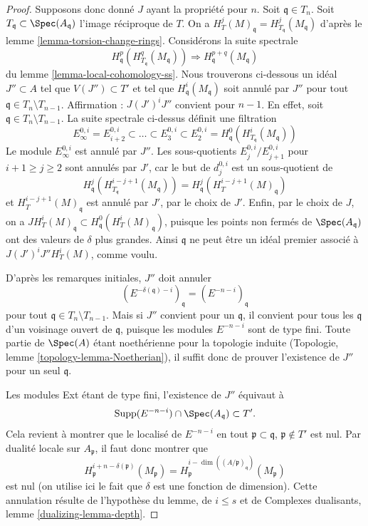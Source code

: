 \begin{proof}
\medskip\noindent
Supposons donc donné $J$ ayant la propriété pour $n$. Soit $\mathfrak q \in T_n$. Soit $T_\mathfrak q \subset \Spec(A_\mathfrak q)$ l'image réciproque de $T$. On a $H^j_T(M)_\mathfrak q = H^j_{T_\mathfrak q}(M_\mathfrak q)$ d'après le lemme \ref{lemma-torsion-change-rings}. Considérons la suite spectrale
$$
H_\mathfrak q^p(H^q_{T_\mathfrak q}(M_\mathfrak q))
\Rightarrow
H^{p + q}_\mathfrak q(M_\mathfrak q)
$$
du lemme \ref{lemma-local-cohomology-ss}. Nous trouverons ci-dessous un idéal $J'' \subset A$ tel que $V(J'') \subset T'$ et tel que $H^i_\mathfrak q(M_\mathfrak q)$ soit annulé par $J''$ pour tout $\mathfrak q \in T_n \setminus T_{n - 1}$. Affirmation : $J (J')^i J''$ convient pour $n - 1$. En effet, soit $\mathfrak q \in T_n \setminus T_{n - 1}$. La suite spectrale ci-dessus définit une filtration
$$
E_\infty^{0, i} = E_{i + 2}^{0, i} \subset \ldots \subset E_3^{0, i} \subset
E_2^{0, i} = H^0_\mathfrak q(H^i_{T_\mathfrak q}(M_\mathfrak q))
$$
Le module $E_\infty^{0, i}$ est annulé par $J''$. Les sous-quotients $E_j^{0, i}/E_{j + 1}^{0, i}$ pour $i + 1 \geq j \geq 2$ sont annulés par $J'$, car le but de $d_j^{0, i}$ est un sous-quotient de
$$
H^j_\mathfrak q(H^{i - j + 1}_{T_\mathfrak q}(M_\mathfrak q)) =
H^j_\mathfrak q(H^{i - j + 1}_T(M)_\mathfrak q)
$$
et $H^{i - j + 1}_T(M)_\mathfrak q$ est annulé par $J'$, par le choix de $J'$. Enfin, par le choix de $J$, on a $J H^i_T(M)_\mathfrak q \subset H^0_\mathfrak q(H^i_T(M)_\mathfrak q)$, puisque les points non fermés de $\Spec(A_\mathfrak q)$ ont des valeurs de $\delta$ plus grandes. Ainsi $\mathfrak q$ ne peut être un idéal premier associé à $J(J')^iJ'' H^i_T(M)$, comme voulu.

\medskip\noindent
D'après les remarques initiales, $J''$ doit annuler
$$
(E^{-\delta(\mathfrak q) - i})_\mathfrak q =
(E^{-n - i})_\mathfrak q
$$
pour tout $\mathfrak q \in T_n \setminus T_{n - 1}$. Mais si $J''$ convient pour un $\mathfrak q$, il convient pour tous les $\mathfrak q$ d'un voisinage ouvert de $\mathfrak q$, puisque les modules $E^{-n - i}$ sont de type fini. Toute partie de $\Spec(A)$ étant noethérienne pour la topologie induite (Topologie, lemme \ref{topology-lemma-Noetherian}), il suffit donc de prouver l'existence de $J''$ pour un seul $\mathfrak q$.

\medskip\noindent
Les modules Ext étant de type fini, l'existence de $J''$ équivaut à
$$
\text{Supp}(E^{-n - i}) \cap \Spec(A_\mathfrak q) \subset T'.
$$
Cela revient à montrer que le localisé de $E^{-n - i}$ en tout $\mathfrak p \subset \mathfrak q$, $\mathfrak p \not \in T'$ est nul. Par dualité locale sur $A_\mathfrak p$, il faut donc montrer que
$$
H^{i + n - \delta(\mathfrak p)}_\mathfrak p(M_\mathfrak p) =
H^{i - \dim((A/\mathfrak p)_\mathfrak q)}_\mathfrak p(M_\mathfrak p)
$$
est nul (on utilise ici le fait que $\delta$ est une fonction de dimension). Cette annulation résulte de l'hypothèse du lemme, de $i \leq s$ et de Complexes dualisants, lemme \ref{dualizing-lemma-depth}.


\end{proof}
